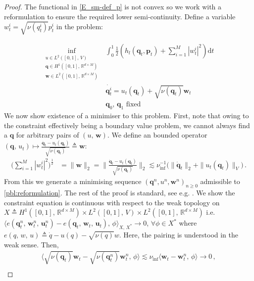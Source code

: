 \documentclass[runningheads]{llncs}
\newcommand{\half}{\frac 12}
\newcommand{\norm}[2]{\| #1 \|_{ #2 }}
\newcommand{\vnorm}[1]{\norm{ #1 }{V}}
\newcommand{\ltwonorm}[1]{\norm{ #1 }{2}}
\newcommand{\diff}[1]{\text{d} #1}
\newcommand{\RdM}{\mathbb{R}^{d\times M}}
\newcommand{\nuinf}{\nu_\text{inf}}
\begin{document}
\begin{proof}
The functional in \eqref{E_sm-def_p} is not convex so we work with a
reformulation to ensure the required lower semi-continuity. Define a
variable $w^i_t = \sqrt{\nu(q_t^i)} p^i_t$ in the problem:

\begin{align}
\inf_{\substack{u \in L^2([0,1],\,V)\\ \mathbf q\in H^1([0,1],\,\RdM)\\\mathbf w\in L^2([0,1],\,\RdM)}}
    & \int_0^1\half\left (h_l(\mathbf q_t,\mathbf p_t) + \sum_{i=1}^M |w_t^i|^2\right )\diff{t}\\
    & \dot{\mathbf q_t^i} = u_t(\mathbf q_t) + \sqrt{\nu(\mathbf q_t)} \mathbf w_t\\
    & \mathbf q_0,\,\mathbf q_1\text{ fixed}
  \label{pbl:reformulation}
\end{align}
We now show existence of a minimiser to this problem. First, note that owing to
the constraint effectively being a boundary value problem, we cannot always find
a $\mathbf q$ for arbitrary pairs of $(u,\,\mathbf w)$. We define an bounded operator
$(\mathbf q,\, u_t)\mapsto \frac{\dot{\mathbf q_t} - u_t(\mathbf
q_t)}{\sqrt{\nu(\mathbf q_t)}} \triangleq \mathbf w$:
\begin{align*}
\Big(\sum_{i=1}^M |w_t^i|^2\Big)^{\frac 12} & = \ltwonorm{\mathbf w} =
\ltwonorm{\frac{\dot{\mathbf q}_t - u_t(\mathbf q_t)}{\sqrt{\nu(\mathbf q_t)}}}
\lesssim \nuinf^{-1}\Big(\ltwonorm{\dot{\mathbf q}_t} + \vnorm{u_t(\mathbf
q_t)}\Big)\,.
\end{align*}
From this we generate a minimising sequence $(\mathbf q^n,
u^n, \mathbf w^n)_{n\geq 0}$ admissible to \eqref{pbl:reformulation}. The rest
of the proof is standard, see e.g. \cite{younes2010shapes}. We show the
constraint equation is continuous with respect to the weak topology on
$X\triangleq H^1([0,1],\,\RdM)\times L^2([0,1],\,V)\times L^2([0,1],\,\RdM)$ i.e.
$\langle e(\mathbf q_t^n,\,\mathbf w_t^n,\,\mathbf u_t^n)-e(\mathbf q_t,\,\mathbf
w_t,\,\mathbf u_t),\,\phi\rangle_{X,\,X^*}\rightarrow 0$, $\forall \phi\in X^*$
where $e(q,\,w,\,u) \triangleq \dot{q} - u(q) - \sqrt{\nu(q)}w$. Here, the
pairing is understood in the weak sense. Then,
\begin{align*}
\langle\sqrt{\nu(\mathbf q_t)}\mathbf w_t - \sqrt{\nu(\mathbf q_t^n)}\mathbf w_t^n,\,\phi\rangle \lesssim \nuinf\langle
\mathbf w_t - \mathbf w_t^n,\,\phi\rangle \rightarrow 0\,,
\end{align*}
\begin{align*}

\end{align*}
\end{proof}
\end{document}

